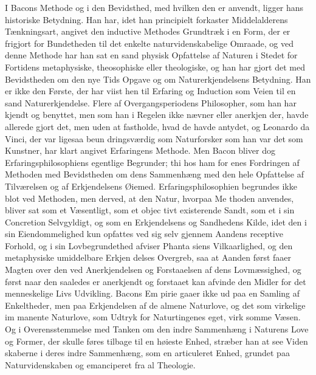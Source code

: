 \documentclass[12pt,a4paper]{book}
\begin{document}
I Bacons Methode og i den Bevidsthed, med hvilken den
er anvendt, ligger hans historiske Betydning. Han har, idet
han principielt forkaster Middelalderens Tænkningsart, angivet
den inductive Methodes Grundtræk i en Form, der er frigjort
for Bundetheden til det enkelte naturvidenskabelige Omraade,
og ved denne Methode har han sat en sand physisk Opfattelse
af Naturen i Stedet for Fortidens metaphysiske, theosophiske
eller theologiske, og han har gjort det med Bevidstheden om
den nye Tids Opgave og om Naturerkjendelsens Betydning.
Han er ikke den Første, der har viist hen til Erfaring og
Induction som Veien til en sand Naturerkjendelse. Flere
af Overgangsperiodens Philosopher, som han har kjendt og
benyttet, men som han i Regelen ikke nævner eller anerkjen\-%
der, havde allerede gjort det, men uden at fastholde, hvad de
havde antydet, og Leonardo da Vinci, der var ligesaa beun\-%
dringsværdig som Naturforsker som han var det som Kunstner,
har klart angivet Erfaringens Methode. Men Bacon bliver dog
Erfaringsphilosophiens egentlige Begrunder; thi hos ham for\-%
enes Fordringen af Methoden med Bevidstheden om dens
Sammenhæng med den hele Opfattelse af Tilværelsen og af
Erkjendelsens Øiemed. Erfaringsphilosophien begrundes ikke
blot ved Methoden, men derved, at den Natur, hvorpaa Me\-%
thoden anvendes, bliver sat som et Væsentligt, som et objec\-%
tivt existerende Sandt, som et i sin Concretion Selvgyldigt, og
som en Erkjendelsens og Sandhedens Kilde, idet den i sin
Eiendommelighed kun opfattes ved sig selv gjennem Aandens
receptive Forhold, og i sin Lovbegrundethed afviser Phanta\-%
siens Vilkaarlighed, og den metaphysiske umiddelbare Erkjen\-%
\setcounter{footnote}{0}%
delses Overgreb, saa at Aanden først faaer Magten over den
ved Anerkjendelsen og Forstaaelsen af dens Lovmæssighed, og
først naar den saaledes er anerkjendt og forstaaet kan afvinde
den Midler for det menneskelige Livs Udvikling. Bacons Em\-%
pirie gaaer ikke ud paa en Samling af Enkeltheder, men paa
Erkjendelsen af de almene Naturlove, og det som virkelige im\-%
manente Naturlove, som Udtryk for Naturtingenes eget, virk\-%
somme Væsen. Og i Overensstemmelse med Tanken om den
indre Sammenhæng i Naturens Love og Former, der skulle
føres tilbage til en høieste Enhed, stræber han at see Viden\-%
skaberne i deres indre Sammenhæng, som en articuleret Enhed,
grundet paa Naturvidenskaben og emanciperet fra al Theologie.
\end{document}
